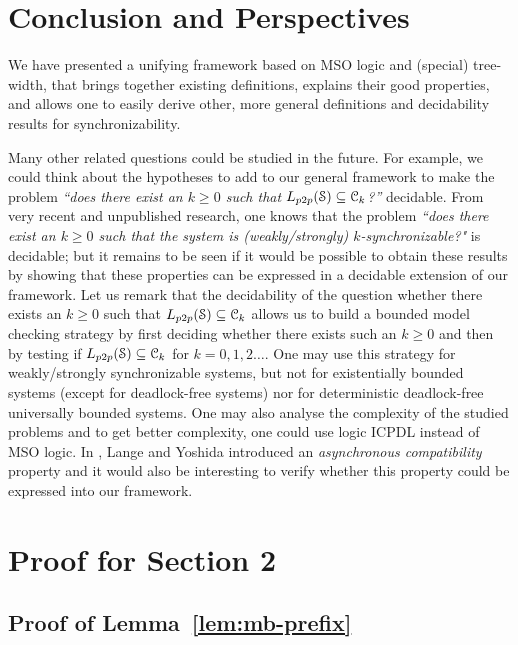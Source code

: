 \documentclass[a4paper,UKenglish,cleveref, autoref, thm-restate]{lipics-v2021}
\begin{document}
\section{Conclusion and Perspectives}
We have presented a unifying framework based on MSO logic and (special) tree-width, that brings together existing definitions, explains their good properties, and allows one to easily derive other, more general definitions and decidability results for synchronizability.

Many other related questions could be studied in the future. For example, we could think about the hypotheses to add to our general framework to make the problem \emph{``does there exist an $k \geq 0$ such that $\ppL{\Sys} \subseteq \Class_k$?''}  decidable. From very recent and unpublished research, one knows that the problem \emph{``does there exist an $k \geq 0$ such that the system is (weakly/strongly) $k$-synchronizable?"} is decidable; but it remains to be seen if it would be possible to obtain these results by showing that these properties can be expressed in a decidable extension of our framework. Let us remark that the decidability of the question whether there exists an $k \geq 0$ such that $\ppL{\Sys} \subseteq \Class_k$ allows us to build a bounded model checking strategy by first deciding whether there exists such an $k \geq 0$ and then by testing if $\ppL{\Sys} \subseteq \Class_k$ for $k=0,1,2 \dots$.
One may use this strategy for weakly/strongly synchronizable systems, but not for existentially bounded systems (except for deadlock-free systems) nor for deterministic deadlock-free universally bounded systems. One may also analyse the complexity of the studied problems and to get better complexity, one could use logic ICPDL instead of MSO logic.
 In \cite{DBLP:journals/corr/abs-1901-09606}, Lange and Yoshida introduced an \emph{asynchronous compatibility} property and it would also be interesting to verify whether this property could be expressed into our framework.







\clearpage
\appendix

\section{Proof for Section 2}

\subsection{Proof of Lemma~\ref{lem:mb-prefix}}
\label{app:mb-prefix}
\end{document}
